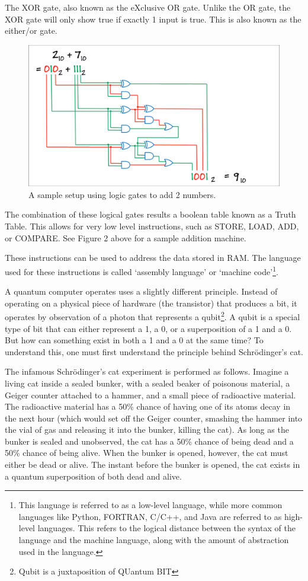 \documentclass[10pt,journal,compsoc]{IEEEtran}
\begin{document}
The XOR gate, also known as the eXclusive OR gate. Unlike the OR gate, the XOR gate will only show true if exactly 1 input is true. This is also known as the either/or gate.
\begin{figure}
	\centering
	\includegraphics[width=0.7\linewidth]{adder}
	\caption{A sample setup using logic gates to add 2 numbers.}
	\label{A sample setup to add two 3 digit binary numbers.}
\end{figure}

The combination of these logical gates results a boolean table known as a Truth Table\cite{Surrey}. This allows for very low level instructions, such as STORE, LOAD, ADD, or COMPARE. See Figure 2 above for a sample addition machine.

These instructions can be used to address the data stored in RAM. The language used for these instructions is called `assembly language' or `machine code'\footnote{This language is referred to as a low-level language, while more common languages like Python, FORTRAN, C/C++, and Java are referred to as high-level languages. This refers to the logical distance between the syntax of the language and the machine language, along with the amount of abstraction used in the language.}.

A quantum computer operates uses a slightly different principle. Instead of operating on a physical piece of hardware (the transistor) that produces a bit, it operates by observation of a photon that represents a qubit\footnote{Qubit is a juxtaposition of QUantum BIT}. A qubit is a special type of bit that can either represent a 1, a 0, or a superposition of a 1 and a 0. But how can something exist in both a 1 and a 0 at the same time? To understand this, one must first understand the principle behind Schr\"{o}dinger’s cat. 


The infamous Schr\"{o}dinger's cat experiment is performed as follows. Imagine a living cat inside a sealed bunker, with a sealed beaker of poisonous material, a Geiger counter attached to a hammer, and a small piece of radioactive material. The radioactive material has a 50\% chance of having one of its atoms decay in the next hour (which would set off the Geiger counter, smashing the hammer into the vial of gas and releasing it into the bunker, killing the cat). As long as the bunker is sealed and unobserved, the cat has a 50\% chance of being dead and a 50\% chance of being alive. When the bunker is opened, however, the cat must either be dead or alive. The instant before the bunker is opened, the cat exists in a quantum superposition of both dead and alive\cite{NatGeo}. 
\end{document}
